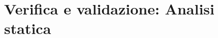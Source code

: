 \documentclass[../main]{subfiles}
\begin{document}
\section{Verifica e validazione: Analisi statica}
\end{document}
